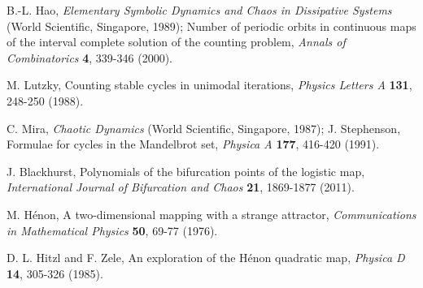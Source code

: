 \documentclass[preprint]{revtex4-1}
\begin{document}
\begin{thebibliography}{50}
 B.-L. Hao,
  \textit{Elementary Symbolic Dynamics and Chaos in  Dissipative Systems}
  (World Scientific, Singapore, 1989);
  Number of periodic orbits in continuous maps of
    the interval complete solution of the counting problem,
  \textit{Annals of Combinatorics}
  \textbf{4},
  339-346
  (2000).

 M. Lutzky,
  Counting stable cycles in unimodal iterations,
  \textit{Physics Letters A}
  \textbf{131},
  248-250
  (1988).

  C. Mira,
  \textit{Chaotic Dynamics}
  (World Scientific, Singapore, 1987);
  J. Stephenson,
  Formulae for cycles in the Mandelbrot set,
  \textit{Physica A}
  \textbf{177},
  416-420
  (1991).

 J. Blackhurst,
  Polynomials of the bifurcation points of the logistic map,
  \textit{International Journal of Bifurcation and Chaos}
  \textbf{21},
  1869-1877
  (2011).

 M. H\'enon,
  A two-dimensional mapping with a strange attractor,
  \textit{Communications in Mathematical Physics}
  \textbf{50},
  69-77
  (1976).

 D. L. Hitzl and F. Zele,
  An exploration of the H\'enon quadratic map,
  \textit{Physica D}
  \textbf{14},
  305-326
  (1985).

\end{thebibliography}
\end{document}
